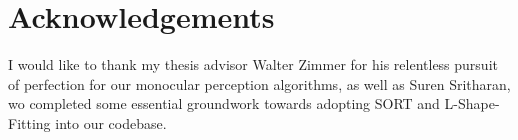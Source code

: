 
\chapter*{Acknowledgements}

\label{ch:ack}

I would like to thank my thesis advisor Walter Zimmer for his relentless pursuit of perfection for our monocular perception algorithms, as well as Suren Sritharan, wo completed some essential groundwork towards adopting SORT and L-Shape-Fitting into our codebase.
